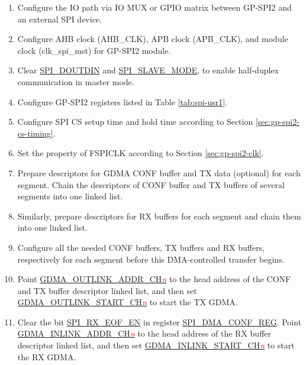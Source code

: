 \documentclass[main\_\_EN.tex]{subfiles}
\begin{document}
 \begin{enumerate}
    \item Configure the IO path via IO MUX or GPIO matrix between GP-SPI2 and an external SPI device.
    \item Configure AHB clock (AHB\_CLK), APB clock (APB\_CLK), and module clock (clk\_spi\_mst) for GP-SPI2 module.

    \item Clear \hyperref[fielddesc:SPIDOUTDIN]{SPI\_DOUTDIN} and \hyperref[fielddesc:SPISLAVEMODE]{SPI\_SLAVE\_MODE}, to enable half-duplex communication in master mode.

    \item Configure GP-SPI2 registers listed in Table \ref{tab:spi-usr1}.

    \item Configure SPI CS setup time and hold time according to Section \ref{sec:gp-spi2-cs-timing}.

    \item Set the property of FSPICLK according to Section \ref{sec:gp-spi2-clk}.

   \item Prepare descriptors for GDMA CONF buffer and TX data (optional) for each segment. Chain the descriptors of CONF buffer and TX buffers of several segments into one linked list.

   \item Similarly, prepare descriptors for RX buffers for each segment and chain them into one linked list.
   \item Configure all the needed CONF buffers, TX buffers and RX buffers, respectively for each segment before this DMA-controlled transfer begins.

   \item Point \hyperref[fielddesc:GDMAOUTLINKADDRCH0]{GDMA\_OUTLINK\_ADDR\_CH\textcolor{red}{\it{n}}} to the head address of the CONF and TX buffer descriptor linked list, and then set \hyperref[fielddesc:GDMAOUTLINKSTARTCH0]{GDMA\_OUTLINK\_START\_CH\textcolor{red}{\it{n}}} to start the TX GDMA.

   \item Clear the bit \hyperref[fielddesc:SPIRXEOFEN]{SPI\_RX\_EOF\_EN} in register \hyperref[regdesc:SPIDMACONFREG]{SPI\_DMA\_CONF\_REG}. Point \hyperref[fielddesc:GDMAINLINKADDRCH0]{GDMA\_INLINK\_ADDR\_CH\textcolor{red}{\it{n}}} to the head address of the RX buffer descriptor linked list, and then set \hyperref[fielddesc:GDMAINLINKSTARTCH0]{GDMA\_INLINK\_START\_CH\textcolor{red}{\it{n}}} to start the RX GDMA.


\end{enumerate}
\end{document}
